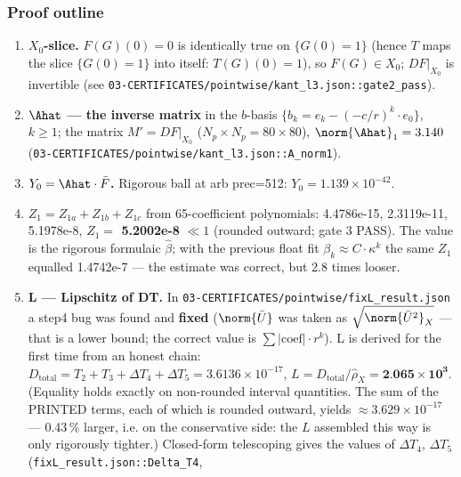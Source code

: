 \subsubsection{Proof outline}
\label{sec:5.1.2}

\begin{enumerate}
\item \textbf{$X_{0}$-slice.} $F(G)(0) = 0$ is identically true on $\{G(0)=1\}$
(hence $T$ maps the slice $\{G(0)=1\}$ into itself: $T(G)(0)=1$), so
$F(G) \in X_{0}$; $DF|_{X_{0}}$ is invertible (see
\texttt{03-\allowbreak CERTIFICATES/\allowbreak pointwise/\allowbreak kant\_\allowbreak l3.json\allowbreak ::\allowbreak gate2\_\allowbreak pass}).
\item \textbf{$\Ahat$ --- the inverse matrix} in the $b$-basis
$\{b_k = e_k - (-c/r)^k\cdot e_0\}$, $k\ge 1$; the matrix $M' = DF|_{X_{0}}$
($N_p\times N_p=80\times 80$), $\norm{\Ahat}_1 = 3.140$
(\texttt{03-\allowbreak CERTIFICATES/\allowbreak pointwise/\allowbreak kant\_\allowbreak l3.json\allowbreak ::\allowbreak A\_\allowbreak norm1}).
\item \textbf{$Y_0 = \Ahat\cdot \bar{F}$.} Rigorous ball at arb prec=512:
$Y_0 = 1.139\times 10^{-42}$.
\item \textbf{$Z_1 = Z_{1a}+Z_{1b}+Z_{1c}$} from 65-coefficient polynomials:
4.4786e-15, 2.3119e-11, 5.1978e-8, \textbf{$Z_1 =$ 5.2002e-8} $\ll 1$ (rounded
outward; gate 3 PASS). The value is the rigorous formulaic $\hat{\beta}$; with
the previous float fit $\beta_k \approx C\cdot \kappa^k$ the same $Z_1$
equalled 1.4742e-7 --- the estimate was correct, but 2.8 times looser.
\item \textbf{L --- Lipschitz of DT.} In
\texttt{03-\allowbreak CERTIFICATES/\allowbreak pointwise/\allowbreak fixL\_\allowbreak result.json} a step4 bug was found and
\textbf{fixed} ($\norm{\bar{U}}$ was taken as $\sqrt{\norm{\bar{U}^{2}}_X}$ ---
that is a lower bound; the correct value is $\sum |\mathrm{coef}|\cdot r^k$). L is
derived for the first time from an honest chain: $D_{\mathrm{total}} = T_2 +
T_3 + \Delta T_4 + \Delta T_5 = 3.6136\times 10^{-17}$,
$L = D_{\mathrm{total}}/\hat{\rho}_X = \textbf{2.065}\times \textbf{10}^{\textbf{3}}$.
(Equality holds exactly on non-rounded interval quantities. The sum of the
PRINTED terms, each of which is rounded outward, yields $\approx 3.629\times
10^{-17}$ --- 0.43\,\% larger, i.e. on the conservative side: the $L$ assembled
this way is only rigorously tighter.) Closed-form telescoping gives the values
of $\Delta T_4$, $\Delta T_5$ (\texttt{fixL\_\allowbreak result.json\allowbreak ::\allowbreak Delta\_\allowbreak T4},

\end{enumerate}
